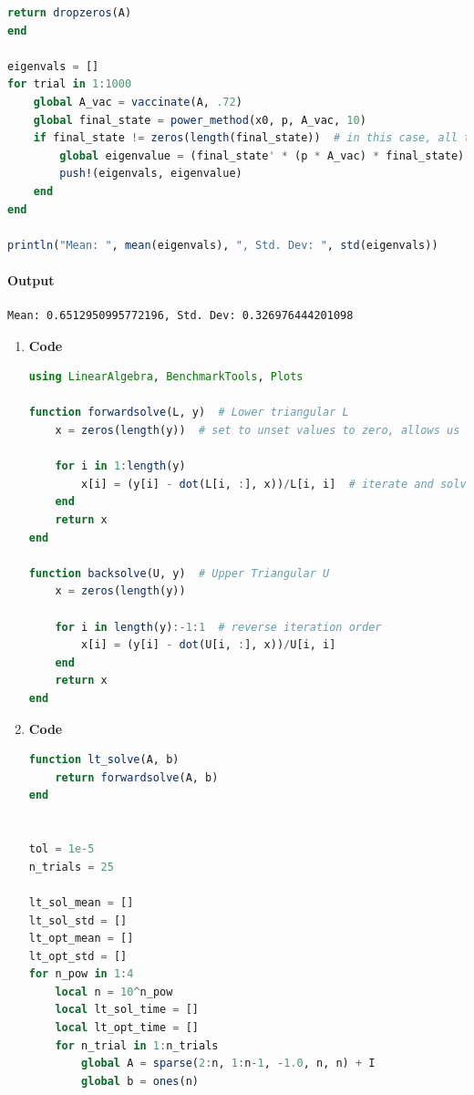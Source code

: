 \documentclass[]{exam}
\let\oldparagraph\paragraph
\renewcommand{\paragraph}[1]{\oldparagraph{#1}\mbox{}}
\begin{document}
\begin{questions}
\begin{enumerate}[label=\arabic*.]
\begin{lstlisting}[language=julia]
	return dropzeros(A)
end

eigenvals = []
for trial in 1:1000
	global A_vac = vaccinate(A, .72)
	global final_state = power_method(x0, p, A_vac, 10)
	if final_state != zeros(length(final_state))  # in this case, all the neighbors of patient zero are vaccinated
		global eigenvalue = (final_state' * (p * A_vac) * final_state) / norm(final_state)^2
		push!(eigenvals, eigenvalue)
	end
end

println("Mean: ", mean(eigenvals), ", Std. Dev: ", std(eigenvals))
		\end{lstlisting}
		\paragraph{Output}
		\begin{lstlisting}
Mean: 0.6512950995772196, Std. Dev: 0.326976444201098
		\end{lstlisting}
\end{enumerate}

\newpage
\question
\hfill

\begin{enumerate}[label=\arabic*.]
	\item \textbf{Code}
		\begin{lstlisting}[language=julia]
using LinearAlgebra, BenchmarkTools, Plots

function forwardsolve(L, y)  # Lower triangular L
	x = zeros(length(y))  # set to unset values to zero, allows us to directly call dot and compute a partial sum

	for i in 1:length(y)
		x[i] = (y[i] - dot(L[i, :], x))/L[i, i]  # iterate and solve sequentially
	end
	return x
end

function backsolve(U, y)  # Upper Triangular U
	x = zeros(length(y))

	for i in length(y):-1:1  # reverse iteration order
		x[i] = (y[i] - dot(U[i, :], x))/U[i, i]
	end
	return x
end
		\end{lstlisting}
	\item \textbf{Code}
		\begin{lstlisting}[language=julia]
function lt_solve(A, b)
	return forwardsolve(A, b)
end


tol = 1e-5
n_trials = 25

lt_sol_mean = []
lt_sol_std = []
lt_opt_mean = []
lt_opt_std = []
for n_pow in 1:4
	local n = 10^n_pow
	local lt_sol_time = []
	local lt_opt_time = []
	for n_trial in 1:n_trials
		global A = sparse(2:n, 1:n-1, -1.0, n, n) + I
		global b = ones(n)
	

\end{lstlisting}
\end{enumerate}
\end{questions}
\end{document}
